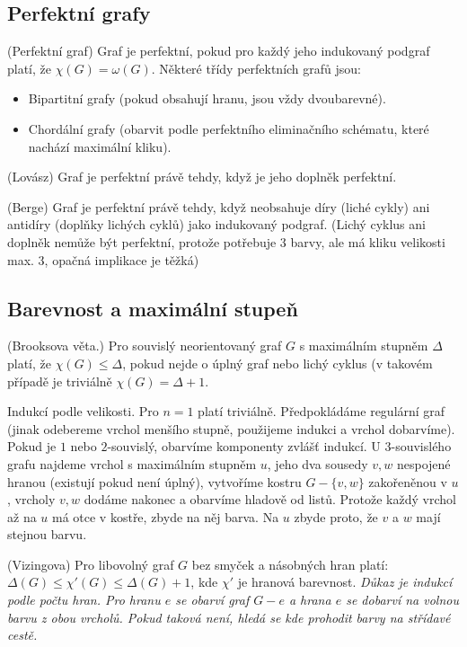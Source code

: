 
\subsection{Perfektní grafy}

\df (Perfektní graf) Graf je perfektní, pokud pro každý jeho indukovaný podgraf
platí, že $\chi(G) = \omega(G)$. Některé třídy perfektních grafů jsou:
\begin{itemize}
	\item Bipartitní grafy (pokud obsahují hranu, jsou vždy dvoubarevné).
	\item Chordální grafy (obarvit podle perfektního eliminačního schématu,
		které nachází maximální kliku).
\end{itemize}

\vt (Lovász) Graf je perfektní právě tehdy, když je jeho doplněk perfektní.

\vt (Berge) Graf je perfektní právě tehdy, když neobsahuje díry (liché cykly)
ani antidíry (doplňky lichých cyklů) jako indukovaný podgraf.  (Lichý cyklus ani
doplněk nemůže být perfektní, protože potřebuje 3 barvy, ale má kliku velikosti
max. 3, opačná implikace je těžká)

\subsection{Barevnost a maximální stupeň}

\vt (Brooksova věta.) Pro souvislý neorientovaný graf $G$ s maximálním stupněm
$\Delta$ platí, že $\chi(G) \leq \Delta$, pokud nejde o úplný graf nebo lichý
cyklus (v takovém případě je triviálně $\chi(G) = \Delta+1$.

\dk Indukcí podle velikosti. Pro $n = 1$ platí triviálně.  Předpokládáme
regulární graf (jinak odebereme vrchol menšího stupně, použijeme indukci a
vrchol dobarvíme). Pokud je $1$ nebo $2$-souvislý, obarvíme komponenty zvlášť
indukcí. U 3-souvislého grafu najdeme vrchol s maximálním stupněm $u$, jeho dva
sousedy $v,w$ nespojené hranou (existují pokud není úplný), vytvoříme kostru
$G-\{v,w\}$ zakořeněnou v $u$, vrcholy $v,w$ dodáme nakonec a obarvíme hladově
od listů.  Protože každý vrchol až na $u$ má otce v kostře, zbyde na něj
barva. Na $u$ zbyde proto, že $v$ a $w$ mají stejnou barvu.

\vt (Vizingova) Pro libovolný graf $G$ bez smyček a násobných hran platí:
$\Delta(G) \leq \chi'(G) \leq \Delta(G) +1$, kde $\chi'$ je hranová barevnost.
{\it Důkaz je indukcí podle počtu hran. Pro hranu $e$ se obarví graf $G-e$ a
	hrana $e$ se dobarví na volnou barvu z obou vrcholů. Pokud taková není,
hledá se kde prohodit barvy na střídavé cestě.}

